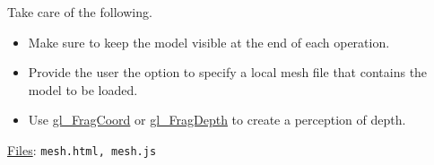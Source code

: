 \documentclass[addpoints]{exam}
\begin{document}
\begin{questions}
  Take care of the following.
  \begin{itemize}
  \item Make sure to keep the model visible at the end of each operation.
  \item Provide the user the option to specify a local mesh file that contains the model to be loaded.
  \item Use \href{https://registry.khronos.org/OpenGL-Refpages/gl4/html/gl_FragCoord.xhtml}{gl\_FragCoord} or \href{https://registry.khronos.org/OpenGL-Refpages/gl4/html/gl_FragDepth.xhtml}{gl\_FragDepth} to create a perception of depth.
  \end{itemize}
  \underline{Files}: {\tt mesh.html, mesh.js}

\end{questions}
\end{document}
